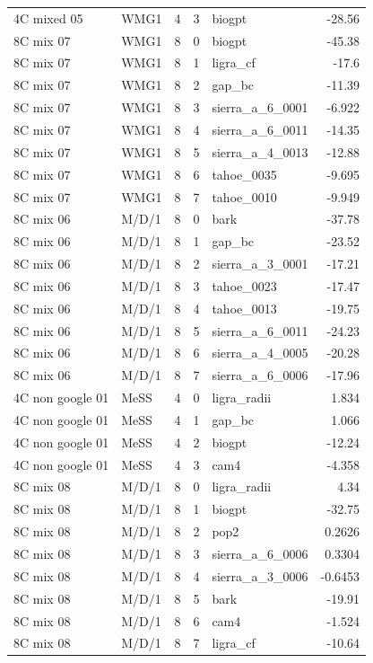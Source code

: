 \begin{tabular}{llrrlr}
4C mixed 05 & WMG1 & 4 & 3 & biogpt & -28.56 \\
8C mix 07 & WMG1 & 8 & 0 & biogpt & -45.38 \\
8C mix 07 & WMG1 & 8 & 1 & ligra\_cf & -17.6 \\
8C mix 07 & WMG1 & 8 & 2 & gap\_bc & -11.39 \\
8C mix 07 & WMG1 & 8 & 3 & sierra\_a\_6\_0001 & -6.922 \\
8C mix 07 & WMG1 & 8 & 4 & sierra\_a\_6\_0011 & -14.35 \\
8C mix 07 & WMG1 & 8 & 5 & sierra\_a\_4\_0013 & -12.88 \\
8C mix 07 & WMG1 & 8 & 6 & tahoe\_0035 & -9.695 \\
8C mix 07 & WMG1 & 8 & 7 & tahoe\_0010 & -9.949 \\
8C mix 06 & M/D/1 & 8 & 0 & bark & -37.78 \\
8C mix 06 & M/D/1 & 8 & 1 & gap\_bc & -23.52 \\
8C mix 06 & M/D/1 & 8 & 2 & sierra\_a\_3\_0001 & -17.21 \\
8C mix 06 & M/D/1 & 8 & 3 & tahoe\_0023 & -17.47 \\
8C mix 06 & M/D/1 & 8 & 4 & tahoe\_0013 & -19.75 \\
8C mix 06 & M/D/1 & 8 & 5 & sierra\_a\_6\_0011 & -24.23 \\
8C mix 06 & M/D/1 & 8 & 6 & sierra\_a\_4\_0005 & -20.28 \\
8C mix 06 & M/D/1 & 8 & 7 & sierra\_a\_6\_0006 & -17.96 \\
4C non google 01 & MeSS & 4 & 0 & ligra\_radii & 1.834 \\
4C non google 01 & MeSS & 4 & 1 & gap\_bc & 1.066 \\
4C non google 01 & MeSS & 4 & 2 & biogpt & -12.24 \\
4C non google 01 & MeSS & 4 & 3 & cam4 & -4.358 \\
8C mix 08 & M/D/1 & 8 & 0 & ligra\_radii & 4.34 \\
8C mix 08 & M/D/1 & 8 & 1 & biogpt & -32.75 \\
8C mix 08 & M/D/1 & 8 & 2 & pop2 & 0.2626 \\
8C mix 08 & M/D/1 & 8 & 3 & sierra\_a\_6\_0006 & 0.3304 \\
8C mix 08 & M/D/1 & 8 & 4 & sierra\_a\_3\_0006 & -0.6453 \\
8C mix 08 & M/D/1 & 8 & 5 & bark & -19.91 \\
8C mix 08 & M/D/1 & 8 & 6 & cam4 & -1.524 \\
8C mix 08 & M/D/1 & 8 & 7 & ligra\_cf & -10.64 \\

\end{tabular}
